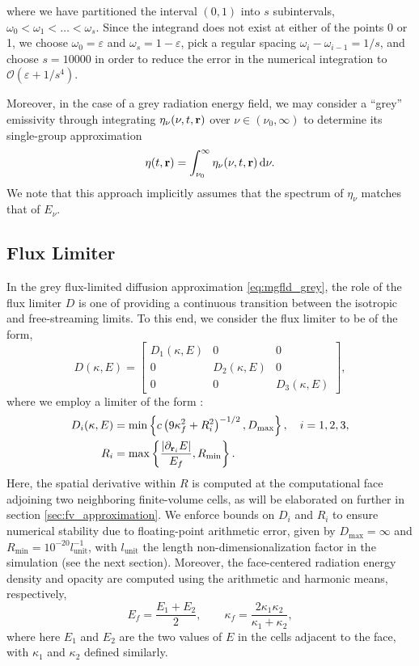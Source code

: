 \documentclass[10pt]{article}
\renewcommand{\(}{\left(}
\renewcommand{\)}{\right)}
\newcommand{\rvec}{{\bf r}}
\newcommand{\Enu}{E_{\nu}}
\newcommand{\Lunit}{l_{\text{unit}}}
\begin{document}
where we have partitioned the interval $(0,1)$ into $s$
subintervals, $\omega_0<\omega_1<\ldots<\omega_s$.  Since the integrand does not
exist at either of the points 0 or 1, we choose $\omega_0=\varepsilon$ and
$\omega_s = 1-\varepsilon$, pick a regular spacing $\omega_i-\omega_{i-1}=1/s$, and
choose $s=10000$ in order to reduce the error in the numerical
integration to $\mathcal O(\varepsilon + 1/s^4)$. 

Moreover, in the case of a grey radiation energy field, we may
consider a ``grey'' emissivity through integrating $\eta_{\nu}(\nu,t,\rvec)$ 
over $\nu\in(\nu_0,\infty)$ to determine its single-group
approximation
\begin{equation}
\label{eq:eta_T}
  \eta(t,\rvec) =\int_{\nu_0}^{\infty} \eta_{\nu}(\nu,t,\rvec)\,\mathrm d\nu.
\end{equation}
We note that this approach implicitly assumes that the spectrum of
$\eta_{\nu}$ matches that of $\Enu$.




\subsection{Flux Limiter}

In the grey flux-limited diffusion approximation
\eqref{eq:mgfld_grey}, the role of the flux limiter
$D$ is one of providing a continuous transition between the isotropic
and free-streaming limits.  To this end, we consider the flux limiter
to be of the form,
\[
   D(\kappa,E) = \left[\begin{array}{ccc} 
       D_1(\kappa,E) & 0 & 0 \\
       0 & D_2(\kappa,E) & 0 \\
       0 & 0 & D_3(\kappa,E) 
     \end{array}\right],
\]
where we employ a limiter of the form  \cite{Morel2000}: 
\begin{align}
  \label{eq:Morel_limiterD}
  D_i(\kappa,E) &= \min\left\{ c \left(9\kappa_f^2 + R_i^2\right)^{-1/2},
    D_\text{max} \right\}, \quad i=1,2,3,\\
  \label{eq:Morel_limiterR}
  R_i &= \max\left\{ \frac{|\partial_{\rvec_i}E|}{E_f}, R_\text{min} \right\}.
\end{align}
Here, the spatial derivative within $R$ is computed at the
computational face adjoining two neighboring finite-volume cells, as
will be elaborated on further in section \ref{sec:fv_approximation}.
We enforce bounds on $D_i$ and $R_i$ to ensure numerical stability due
to floating-point arithmetic error, given by 
$D_\text{max} = \infty$ 
and 
$R_\text{min} = 10^{-20} \Lunit^{-1}$, 
with $\Lunit$ the length non-dimensionalization factor in the simulation
(see the next section).  Moreover, the face-centered radiation energy
density and opacity are computed using the arithmetic and harmonic
means, respectively,
\[
  E_f = \frac{E_1 + E_2}{2}, \qquad \kappa_f =
  \frac{2\kappa_1\kappa_2}{\kappa_1+\kappa_2}, 
\]
where here $E_1$ and $E_2$ are the two values of $E$ in the cells
adjacent to the face, with $\kappa_1$ and $\kappa_2$ defined
similarly. 
\end{document}

